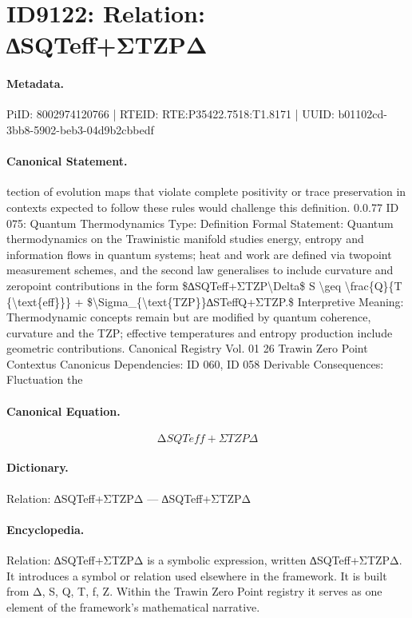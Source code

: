 \section*{ID9122: Relation: ∆SQTeff+ΣTZPΔ}
\paragraph{Metadata.}
PiID: 8002974120766 | RTEID: RTE:P35422.7518:T1.8171 | UUID: b01102cd-3bb8-5902-beb3-04d9b2cbbedf

\paragraph{Canonical Statement.}
tection of evolution maps that violate complete positivity or trace preservation in contexts expected to follow these rules would challenge this definition. 0.0.77 ID 075: Quantum Thermodynamics Type: Definition Formal Statement: Quantum thermodynamics on the Trawinistic manifold studies energy, entropy and information flows in quantum systems; heat and work are defined via twopoint measurement schemes, and the second law generalises to include curvature and zeropoint contributions in the form \$∆SQTeff+ΣTZP\textbackslash{}Delta\$ S \textbackslash{}geq \textbackslash{}frac\{Q\}\{T \{\textbackslash{}text\{eff\}\}\} + \$\textbackslash{}Sigma\_\{\textbackslash{}text\{TZP\}\}∆STeffQ+ΣTZP.\$ Interpretive Meaning: Thermodynamic concepts remain but are modified by quantum coherence, curvature and the TZP; effective temperatures and entropy production include geometric contributions. Canonical Registry Vol. 01 26 Trawin Zero Point Contextus Canonicus Dependencies: ID 060, ID 058 Derivable Consequences: Fluctuation the

\paragraph{Canonical Equation.}
\[
∆SQTeff+ΣTZP\Delta
\]

\paragraph{Dictionary.}
Relation: ∆SQTeff+ΣTZPΔ — ∆SQTeff+ΣTZPΔ

\paragraph{Encyclopedia.}
Relation: ∆SQTeff+ΣTZPΔ is a symbolic expression, written ∆SQTeff+ΣTZPΔ. It introduces a symbol or relation used elsewhere in the framework. It is built from Δ, S, Q, T, f, Z. Within the Trawin Zero Point registry it serves as one element of the framework's mathematical narrative.
